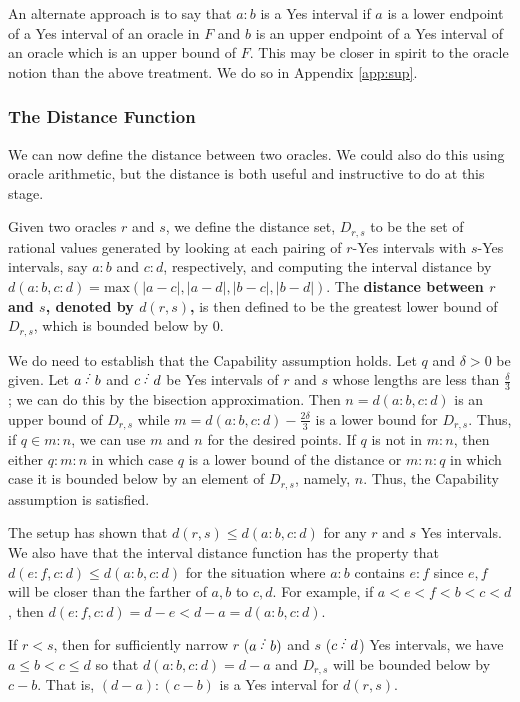 \documentclass[12pt]{article}
\begin{document}
An alternate approach is to say that $a:b$ is a Yes interval if $a$ is a lower endpoint of a Yes interval of an oracle in $F$ and $b$ is an upper endpoint of a Yes interval of an oracle which is an upper bound of $F$. This may be closer in spirit to the oracle notion than the above treatment. We do so in Appendix \ref{app:sup}. 



\subsubsection{The Distance Function}

We can now define the distance between two oracles. We could also do this using oracle arithmetic, but the distance is both useful and instructive to do at this stage. 

Given two oracles $r$ and $s$, we define the distance set, $D_{r,s}$ to be the set of rational values generated by looking at each pairing of $r$-Yes intervals with $s$-Yes intervals, say  $a:b$ and $c:d$, respectively, and computing the interval distance by $d(a:b,c:d) = \mathrm{max}(|a-c|, |a-d|,|b-c|,|b-d|)$. The \textbf{distance between $r$ and $s$, denoted by $d(r,s)$,} is then defined to be the greatest lower bound of $D_{r,s}$, which is bounded below by 0. 

We do need to establish that the Capability assumption holds. Let $q$ and $\delta > 0$ be given. Let $a\lte b$ and $c \lte d$ be Yes intervals of $r$ and $s$ whose lengths are less than $\frac{\delta}{3}$; we can do this by the bisection approximation. Then $n = d(a:b, c:d)$ is an upper bound of $D_{r,s}$ while $m = d(a:b, c:d) - \frac{2 \delta}{3}$ is a lower bound for $D_{r,s}$. Thus, if $q \in m:n$, we can use $m$ and $n$ for the desired points. If $q$ is not in $m:n$, then either $q:m:n$ in which case $q$ is a lower bound of the distance or $m:n:q$ in which case it is bounded below by an element of $D_{r,s}$, namely, $n$. Thus, the Capability assumption is satisfied. 

The setup has shown that $d(r,s) \leq d(a:b, c:d)$ for any $r$ and $s$ Yes intervals. We also have that the interval distance function has the property that $d(e:f, c:d) \leq d(a:b, c:d)$ for the situation where $a:b$ contains $e:f$ since $e, f$ will be closer than the farther of $a,b$ to $c,d$. For example, if $a < e < f < b < c< d$, then $d(e:f, c:d) = d-e < d-a = d(a:b, c:d)$. 

If $r<s$, then for sufficiently narrow $r$ ($a\lte b)$ and $s$ ($c\lte d$) Yes intervals, we have $a\leq b<c \leq d$ so that $d(a:b,c:d) = d-a$ and $D_{r,s}$ will be bounded below by $c-b$. That is, $(d-a):(c-b)$ is a Yes interval for $d(r,s)$.
\end{document}
